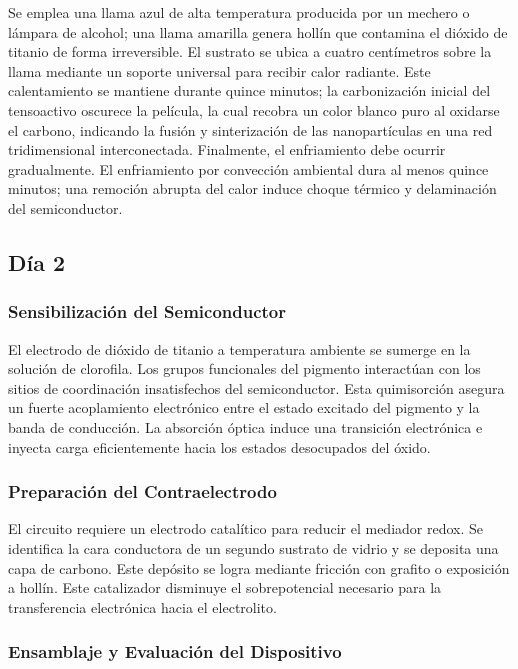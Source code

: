 \documentclass[11pt, a4paper]{article}
\begin{document}
Se emplea una llama azul de alta temperatura producida por un mechero o lámpara
de alcohol; una llama amarilla genera hollín que contamina el dióxido de
titanio de forma irreversible. El sustrato se ubica a cuatro centímetros sobre
la llama mediante un soporte universal para recibir calor radiante. Este
calentamiento se mantiene durante quince minutos; la carbonización inicial del
tensoactivo oscurece la película, la cual recobra un color blanco puro al
oxidarse el carbono, indicando la fusión y sinterización de las nanopartículas
en una red tridimensional interconectada. Finalmente, el enfriamiento debe
ocurrir gradualmente. El enfriamiento por convección ambiental dura al menos
quince minutos; una remoción abrupta del calor induce choque térmico y
delaminación del semiconductor.

\subsection{Día 2}
\subsubsection{Sensibilización del Semiconductor}

El electrodo de dióxido de titanio a temperatura ambiente se sumerge en la
solución de clorofila. Los grupos funcionales del pigmento interactúan con los
sitios de coordinación insatisfechos del semiconductor. Esta quimisorción
asegura un fuerte acoplamiento electrónico entre el estado excitado del
pigmento y la banda de conducción. La absorción óptica induce una transición
electrónica e inyecta carga eficientemente hacia los estados desocupados del
óxido.

\subsubsection{Preparación del Contraelectrodo}

El circuito requiere un electrodo catalítico para reducir el mediador redox. Se
identifica la cara conductora de un segundo sustrato de vidrio y se deposita
una capa de carbono. Este depósito se logra mediante fricción con grafito o
exposición a hollín. Este catalizador disminuye el sobrepotencial necesario
para la transferencia electrónica hacia el electrolito.

\subsubsection{Ensamblaje y Evaluación del Dispositivo}
\end{document}
